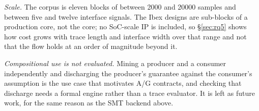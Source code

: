 \emph{Scale.} The corpus is eleven blocks of between 2000 and 20000 samples and between five
and twelve interface signals. The Ibex designs are sub-blocks of a production core, not the
core; no SoC-scale IP is included, so \S\ref{sec:rq5} shows how cost grows with trace length
and interface width over that range and not that the flow holds at an order of magnitude
beyond it.

\emph{Compositional use is not evaluated.} Mining a producer and a consumer independently and
discharging the producer's guarantee against the consumer's assumption is the use case that
motivates A/G contracts, and checking that discharge needs a formal engine rather than a
trace evaluator. It is left as future work, for the same reason as the SMT backend above.

